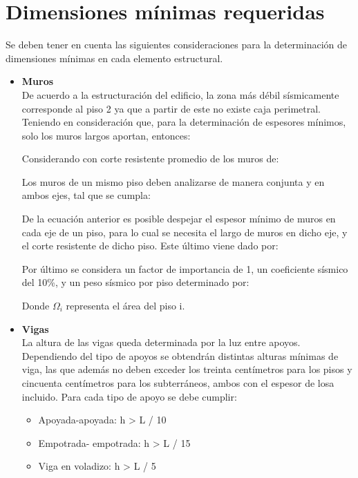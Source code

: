 \documentclass[letterpaper,11pt]{article} %
\begin{document}
\section{Dimensiones mínimas requeridas}
Se deben tener en cuenta las siguientes consideraciones para la determinación de dimensiones mínimas en cada elemento estructural.
    \begin{itemize}
        \item \textbf{Muros}\\
        De acuerdo a la estructuración del edificio, la zona más débil sísmicamente corresponde al piso 2 ya que a partir de este no existe caja perimetral.
        Teniendo en consideración que, para la determinación de espesores mínimos, solo los muros largos aportan, entonces:
        
        Considerando con corte resistente promedio de  los muros de:
        
        Los muros de un mismo piso deben analizarse de manera conjunta y en ambos ejes, tal que se cumpla:
        
        
        De la ecuación anterior es posible despejar el espesor mínimo de muros en cada eje de un piso, para lo cual se necesita el largo de muros en dicho eje, y el corte resistente de dicho piso. Este último viene dado por:
        
        
        Por último se considera un factor de importancia de 1, un coeficiente sísmico del 10\%, y un peso sísmico por piso determinado por:
        
        
        
        Donde $\Omega_{i}$ representa el área del piso i.

        \newpage
        \item \textbf{Vigas}\\
        La altura de las vigas queda determinada por la luz entre apoyos. Dependiendo del tipo de apoyos se obtendrán distintas alturas mínimas de viga, las que además no deben exceder los treinta centímetros para los pisos y cincuenta centímetros para los subterráneos, ambos con el espesor de losa incluido. 
        Para cada tipo de apoyo se debe cumplir:
        \begin{itemize}
            \item Apoyada-apoyada: h > L / 10
            \item Empotrada- empotrada: h > L / 15
            \item Viga en voladizo: h > L / 5
        \end{itemize}
        

\end{itemize}
\end{document}
